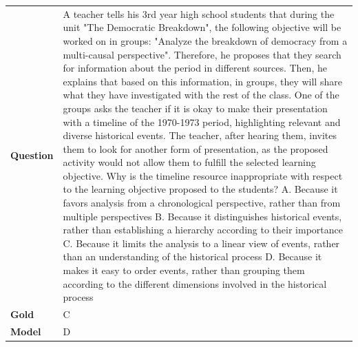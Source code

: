 \begin{longtable}{@{}l p{13cm}@{}}
  \textbf{Question}  & A teacher tells his 3rd year high school students that during the unit "The Democratic Breakdown", the following objective will be worked on in groups: "Analyze the breakdown of democracy from a multi-causal perspective". Therefore, he proposes that they search for information about the period in different sources. Then, he explains that based on this information, in groups, they will share what they have investigated with the rest of the class. One of the groups asks the teacher if it is okay to make their presentation with a timeline of the 1970-1973 period, highlighting relevant and diverse historical events. The teacher, after hearing them, invites them to look for another form of presentation, as the proposed activity would not allow them to fulfill the selected learning objective. Why is the timeline resource inappropriate with respect to the learning objective proposed to the students? \newline A. Because it favors analysis from a chronological perspective, rather than from multiple perspectives \newline B. Because it distinguishes historical events, rather than establishing a hierarchy according to their importance \newline C. Because it limits the analysis to a linear view of events, rather than an understanding of the historical process \newline D. Because it makes it easy to order events, rather than grouping them according to the different dimensions involved in the historical process   \\
  \textbf{Gold}      & C       \\
  \textbf{Model}     & D  \\

\end{longtable}
